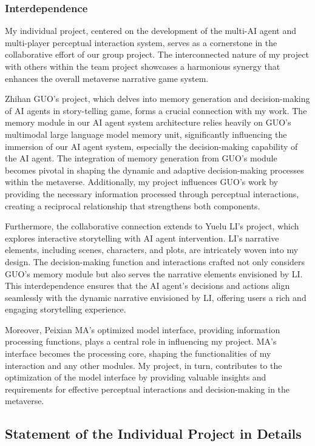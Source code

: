 \subsubsection{Interdependence}
My individual project, centered on the development of the multi-AI agent and multi-player perceptual interaction system, serves as a cornerstone in the collaborative effort of our group project. 
The interconnected nature of my project with others within the team project showcases a harmonious synergy that enhances the overall metaverse narrative game system.

Zhihan GUO's project, which delves into memory generation and decision-making of AI agents in story-telling game, 
forms a crucial connection with my work. The memory module in our AI agent system architecture relies heavily on GUO's multimodal large language model memory unit, significantly influencing the immersion of our AI agent system, especially the decision-making capability of the AI agent. 
The integration of memory generation from GUO's module becomes pivotal in shaping the dynamic and adaptive decision-making processes within the metaverse. 
Additionally, my project influences GUO's work by providing the necessary information processed through perceptual interactions, creating a reciprocal relationship that strengthens both components.

Furthermore, the collaborative connection extends to Yuelu LI's project, which explores interactive storytelling with AI agent intervention. 
LI's narrative elements, including scenes, characters, and plots, are intricately woven into my design. 
The decision-making function and interactions crafted not only considers GUO's memory module but also serves the narrative elements envisioned by LI. 
This interdependence ensures that the AI agent's decisions and actions align seamlessly with the dynamic narrative envisioned by LI, offering users a rich and engaging storytelling experience.

Moreover, Peixian MA's optimized model interface, providing information processing functions, plays a central role in influencing my project. 
MA's interface becomes the processing core, shaping the functionalities of my interaction and any other modules. 
My project, in turn, contributes to the optimization of the model interface by providing valuable insights and requirements for effective perceptual interactions and decision-making in the metaverse.

\subsection{Statement of the Individual Project in Details}

